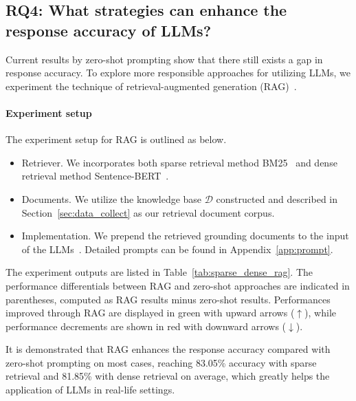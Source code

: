 \subsection{RQ4: What strategies can enhance the response accuracy of LLMs?}
\label{sec:rq4}

Current results by zero-shot prompting show that there still exists a gap in response accuracy.
To explore more responsible approaches for utilizing LLMs, we experiment the technique of retrieval-augmented generation (RAG)~\cite{guu2020retrieval, karpukhin-etal-2020-dense, lewis2020retrieval}.

\paragraph{Experiment setup} The experiment setup for RAG is outlined as below.
\begin{itemize}[left=0pt, topsep=0pt, itemsep=0pt, partopsep=0pt,parsep=0pt]
    \item Retriever. We incorporates both sparse retrieval method BM25~\cite{robertson2009probabilistic} and dense retrieval method Sentence-BERT~\cite{reimers-2019-sentence-bert, thakur-2020-AugSBERT}.
    \item Documents. We utilize the knowledge base $\mathcal{D}$ constructed and described in Section~\ref{sec:data_collect} as our retrieval document corpus.
    \item Implementation. We prepend the retrieved grounding documents to the input of the LLMs~\cite{ram2023context, shi-etal-2024-replug}. Detailed prompts can be found in Appendix~\ref{app:prompt}.
\end{itemize}

The experiment outputs are listed in Table~\ref{tab:sparse_dense_rag}. The performance differentials between RAG and zero-shot approaches are indicated in parentheses, computed as RAG results minus zero-shot results.
Performances improved through RAG are displayed in green with upward arrows ($\uparrow$), while performance decrements are shown in red with downward arrows ($\downarrow$).

It is demonstrated that RAG enhances the response accuracy compared with zero-shot prompting on most cases, reaching 83.05\% accuracy with sparse retrieval and 81.85\% with dense retrieval on average, which greatly helps the application of LLMs in real-life settings.

